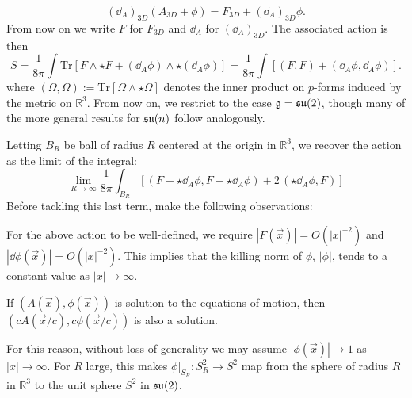 	\begin{equation}
		(\dd_A)_{3D}(A_{3D} + \phi) = F_{3D} + (\dd_A)_{3D} \phi.
	\end{equation}
	From now on we write $F$ for $F_{3D}$ and $\dd_A$ for $(\dd_A)_{3D}$. The associated action is then
	\begin{equation}
		S = \frac{1}{8\pi} \int \mathrm{Tr} \left[F \wedge \star F + (\dd_A \phi) \wedge \star (\dd_A \phi)\right] = \frac{1}{8\pi} \int \left[(F,F) + (\dd_A \phi,\dd_A \phi)\right].
	\end{equation}
	where $(\Omega, \Omega) := \mathrm{Tr} [\Omega \wedge \star \Omega]$ denotes the inner product on $p$-forms induced by the metric on $\mathbb R^3$. From now on, we restrict to the case $\frak g = \frak{su}(2)$, though many of the more general results for $\frak{su}(n)$ follow analogously.
	
	
	Letting $B_R$ be ball of radius $R$ centered at the origin in $\mathbb R^3$, we recover the action as the limit of the integral:
	\begin{equation*}
		\lim_{R \to \infty} \frac{1}{8\pi} \int_{B_R} \left[ (F - \star \dd_A \phi, F - \star \dd_A \phi) + 2\, (\star \dd_A \phi, F) \right]
	\end{equation*}
	Before tackling this last term, make the following observations:
	\begin{obs}
		For the above action to be well-defined, we require $|F(\vec x)| = O(|x|^{-2})$ and $|\dd \phi(\vec x) |= O(|x|^{-2})$. This implies that the killing norm of $\phi$, $|\phi|$, tends to a constant value as $|x| \to \infty$.
	\end{obs}
	\begin{obs}
		If $(A(\vec x), \phi(\vec x))$ is solution to the equations of motion, then $(c A(\vec x/c), c \phi(\vec x/c))$ is also a solution.  
	\end{obs}
	For this reason, without loss of generality we may assume $|\phi(\vec x)| \to 1$ as $|x| \to \infty$. For $R$ large, this makes $\phi|_{S_R}: S^2_R \to S^2$ map from the sphere of radius $R$ in $\mathbb R^3$ to the unit sphere $S^2$ in $\frak{su}(2)$. 
	
